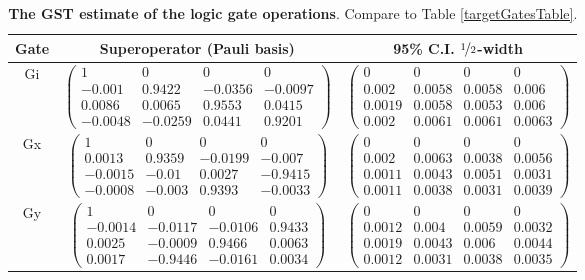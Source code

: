 \documentclass{article}[11pt]
\begin{document}
\begin{table}[h]
\begin{center}
\begin{tabular}[l]{|c|c|c|}
\hline
Gate & Superoperator (Pauli basis) & 95\% C.I. $\nicefrac{1}{2}$-width \\ \hline
Gi & $ \left(\!\!\begin{array}{cccc}
1 & 0 & 0 & 0 \\ 
-0.001 & 0.9422 & -0.0356 & -0.0097 \\ 
0.0086 & 0.0065 & 0.9553 & 0.0415 \\ 
-0.0048 & -0.0259 & 0.0441 & 0.9201
 \end{array}\!\!\right) $
 & $ \left(\!\!\begin{array}{cccc}
0 & 0 & 0 & 0 \\ 
0.002 & 0.0058 & 0.0058 & 0.006 \\ 
0.0019 & 0.0058 & 0.0053 & 0.006 \\ 
0.002 & 0.0061 & 0.0061 & 0.0063
 \end{array}\!\!\right) $
 \\ \hline
Gx & $ \left(\!\!\begin{array}{cccc}
1 & 0 & 0 & 0 \\ 
0.0013 & 0.9359 & -0.0199 & -0.007 \\ 
-0.0015 & -0.01 & 0.0027 & -0.9415 \\ 
-0.0008 & -0.003 & 0.9393 & -0.0033
 \end{array}\!\!\right) $
 & $ \left(\!\!\begin{array}{cccc}
0 & 0 & 0 & 0 \\ 
0.002 & 0.0063 & 0.0038 & 0.0056 \\ 
0.0011 & 0.0043 & 0.0051 & 0.0031 \\ 
0.0011 & 0.0038 & 0.0031 & 0.0039
 \end{array}\!\!\right) $
 \\ \hline
Gy & $ \left(\!\!\begin{array}{cccc}
1 & 0 & 0 & 0 \\ 
-0.0014 & -0.0117 & -0.0106 & 0.9433 \\ 
0.0025 & -0.0009 & 0.9466 & 0.0063 \\ 
0.0017 & -0.9446 & -0.0161 & 0.0034
 \end{array}\!\!\right) $
 & $ \left(\!\!\begin{array}{cccc}
0 & 0 & 0 & 0 \\ 
0.0012 & 0.004 & 0.0059 & 0.0032 \\ 
0.0019 & 0.0043 & 0.006 & 0.0044 \\ 
0.0012 & 0.0031 & 0.0038 & 0.0035
 \end{array}\!\!\right) $
 \\ \hline
\end{tabular}

\caption{\textbf{The GST estimate of the logic gate operations}.  Compare to Table \ref{targetGatesTable}.\label{bestGatesetGatesTable}}
\end{center}
\end{table}
\end{document}
